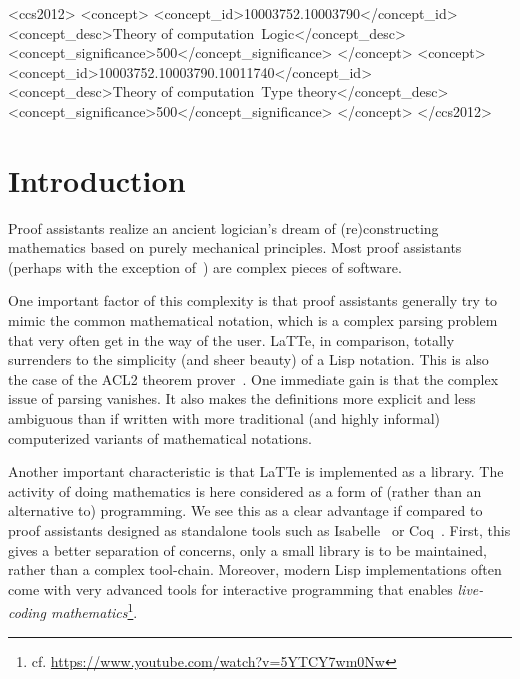 \documentclass{styles/sig-alternate-05-2015}
\begin{document}
 \begin{CCSXML}
<ccs2012>
<concept>
<concept_id>10003752.10003790</concept_id>
<concept_desc>Theory of computation~Logic</concept_desc>
<concept_significance>500</concept_significance>
</concept>
<concept>
<concept_id>10003752.10003790.10011740</concept_id>
<concept_desc>Theory of computation~Type theory</concept_desc>
<concept_significance>500</concept_significance>
</concept>
</ccs2012>
\end{CCSXML}


%
\printccsdesc




\section{Introduction}

\begin{sloppypar}
 Proof assistants realize an ancient logician's dream of
(re)constructing mathematics based on purely mechanical
principles. Most proof assistants (perhaps with the
exception of~\cite{harrison-hollight}) are complex
pieces of software.
\end{sloppypar}
One important factor of this
complexity is that proof
assistants generally try to mimic the common mathematical
notation, which is a complex parsing problem that very often
get in the way of the user. LaTTe, in comparison, totally surrenders to the simplicity (and sheer beauty)
of a Lisp notation. This is also the case of the ACL2 theorem prover~\cite{acl2:Kaufmann:2000}.
One immediate gain is that the complex issue of parsing vanishes. It also makes the definitions
more explicit and less ambiguous than if written
with more traditional (and highly informal) computerized variants of mathematical notations.

Another important characteristic is that LaTTe is implemented as a library.
  The activity of doing mathematics is here considered as a form of
 (rather than an alternative to) programming. We see this
 as a clear advantage if compared to proof assistants designed as
 standalone tools such as Isabelle~\cite{isabelle:book} or
 Coq~\cite{coq}. First, this gives a better separation of concerns,
 only a small library is to be maintained, rather than a complex tool-chain.
 Moreover, modern Lisp
 implementations often come with very advanced tools for interactive
 programming that enables \emph{live-coding mathematics}\footnote{cf. \url{https://www.youtube.com/watch?v=5YTCY7wm0Nw}}.
\end{document}
